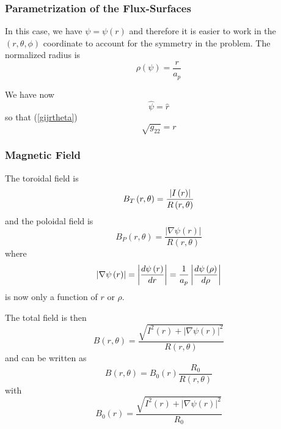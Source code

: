 

\subsubsection{Parametrization of the Flux-Surfaces}

In this case, we have $\psi =\psi \left( r\right) $ and therefore it is
easier to work in the $\left( r,\theta ,\phi \right) $ coordinate to account
for the symmetry in the problem. The normalized radius is
\begin{equation}
\rho \left( \psi \right) =\frac{r}{a_{p}}
\end{equation}

We have now
\begin{equation}
\widehat{\psi}=\widehat{r}
\end{equation}
so that (\ref{gijrtheta})
\begin{equation}
\sqrt{g_{22}}=r  \label{g22circ}
\end{equation}

\subsubsection{Magnetic Field}

The toroidal field is
\begin{equation}
B_{T}\left( r,\theta \right) =\frac{\left| I\left( r\right) \right| }{%
R\left( r,\theta \right) }
\end{equation}
and the poloidal field is
\begin{equation}
B_{P}\left( r,\theta \right) =\frac{\left| \nabla \psi \left( r\right)
\right| }{R\left( r,\theta \right) }  \label{Bpcirc}
\end{equation}
where
\begin{equation}
\left| \nabla \psi \left( r\right) \right| =\left| \frac{d\psi \left(
r\right) }{dr}\right| =\frac{1}{a_{p}}\left| \frac{d\psi \left( \rho \right) }{%
d\rho }\right|
\end{equation}
is now only a function of $r$ or $\rho $.

The total field is then
\begin{equation}
B\left( r,\theta \right) =\frac{\sqrt{I^{2}\left( r\right) +\left| \nabla
\psi \left( r\right) \right| ^{2}}}{R\left( r,\theta \right) }
\end{equation}
and can be written as
\begin{equation}
B\left( r,\theta \right) =B_{0}\left( r\right) \frac{R_{0}}{R\left( r,\theta
\right) }  \label{Bcirc}
\end{equation}
with
\begin{equation}
B_{0}\left( r\right) =\frac{\sqrt{I^{2}\left( r\right) +\left| \nabla \psi
\left( r\right) \right| ^{2}}}{R_{0}}
\end{equation}


